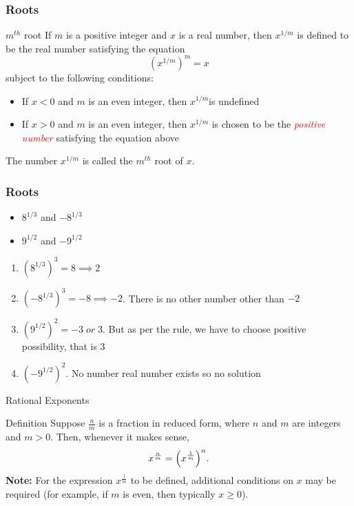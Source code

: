 \documentclass{beamer}
\begin{document}
  \begin{frame}
    \frametitle{Roots}
    \begin{block}{\(m^{th}\) root}
   If \(m\) is a positive integer and \(x\) is a real number, then \(x^{1/m}\) is defined to be the real number satisfying the equation
   \[\left(x^{1/m}\right)^{m} = x \]
  subject to the following conditions:
  \begin{itemize}
    \item  If \(x < 0\) and \(m\) is an even integer, then \(x^{1/m} \)is undefined 
    \item If \(x > 0\) and \(m\) is an even integer, then \(x^{1/m} \) is chosen to be the \textit{\textcolor{red}{positive number}} satisfying the equation above
  \end{itemize}
The number \(x^{1/m}\) is called the \textbf{\(m^{th}\)} root of \(x\).
\end{block}
  
\end{frame}
\begin{frame}
  \frametitle{Roots}
  \begin{example}
    \begin{itemize}
      \item \(8^{1/3}\) and \(-8^{1/3}\)
      \item \(9^{1/2}\) and \(-9^{1/2}\)
    \end{itemize}
  \end{example}
  \begin{solution}
    \begin{enumerate}
      \item \( \left(8^{1/3}\right)^{3} = 8 \implies 2 \)
      \item \( \left(-8^{1/3}\right)^{3} = -8 \implies -2 \). There is no other number other than \(-2\)
      \item \( \left( 9^{1/2} \right)^{2} = -3 \; or \;3\). But as per the rule, we have to choose positive possibility, that is \(3\)
      \item \( \left( -9^{1/2} \right)^{2} \). No number real number exists so no solution 
    \end{enumerate}
  \end{solution}
\end{frame}


\begin{frame}{Rational Exponents}
  \begin{block}{Definition}
  Suppose \(\frac{n}{m}\) is a fraction in reduced form, where \(n\) and \(m\) are integers and \(m > 0\). Then, whenever it makes sense,
  \[
    x^{\frac{n}{m}} = \Bigl(x^{\frac{1}{m}}\Bigr)^n.
  \]
  \vspace{0.5em}
  \textbf{Note:} For the expression \(x^{\frac{1}{m}}\) to be defined, additional conditions on \(x\) may be required (for example, if \(m\) is even, then typically \(x \ge 0\)).
  \end{block}
\end{frame}
\end{document}
